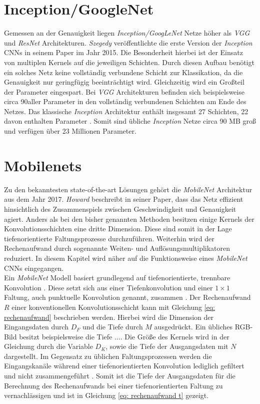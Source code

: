 		\section*{Inception/GoogleNet}
		\label{subsec: inception}
		Gemessen an der Genauigkeit liegen \textit{Inception/GoogLeNet} Netze höher als \textit{VGG} und \textit{ResNet} Architekturen. \textit{Szegedy} veröffentlichte die erste Version der \textit{Inception} CNNs in seinem Paper \cite{inception} im Jahr 2015. Die Besonderheit hierbei ist der Einsatz von multiplen Kernels auf die jeweiligen Schichten. Durch diesen Aufbau benötigt ein solches Netz keine vollständig verbundene Schicht zur Klassikation, da die Genauigkeit nur geringfügig beeinträchtigt wird. Gleichzeitig wird ein Großteil der Parameter eingespart. Bei \textit{VGG} Architekturen befinden sich beispielsweise circa 90\percent\text{ }aller Parameter in den vollständig verbundenen Schichten am Ende des Netzes. Das klassische \textit{Inception} Architektur enthält insgesamt 27 Schichten, 22 davon enthalten Parameter \cite{inception}. Somit sind übliche \textit{Inception} Netze circa 90 MB groß und verfügen über 23 Millionen Parameter.\\ 
		

		
		\section*{Mobilenets}
		\label{subsec: mobilenets}
		Zu den bekanntesten state-of-the-art Lösungen gehört die \textit{MobileNet} Architektur aus dem Jahr 2017. \textit{Howard} beschreibt in seiner Paper, dass das Netz effizient hinsichtlich des Zusammenspiels zwischen Geschwindigkeit und Genauigkeit agiert. Anders als bei den bisher genannten Methoden besitzen einige Kernels der Konvolutionsschichten eine dritte Dimension. Diese sind somit in der Lage tiefenorientierte Faltungsprozesse durchzuführen. Weiterhin wird der Rechenaufwand durch sogenannte Weiten- und Auflösungsmultiplikatoren reduziert. In diesem Kapitel wird näher auf die Funktionsweise eines \textit{MobileNet} CNNs eingegangen.\\
		
		Ein \textit{MobileNet} Modell basiert grundlegend auf tiefenorientierte, trennbare Konvolution \cite{mobilenets}. Diese setzt sich aus einer Tiefenkonvolution und einer $1\times1$ Faltung, auch punktuelle Konvolution genannt, zusammen \cite{mobilenets}. Der Rechenaufwand $R$ einer konventionellen Konvolutionsschicht kann mit Gleichung \ref{eq: rechenaufwand} beschrieben werden. Hierbei wird die Dimension der Eingangsdaten durch $D_F$ und die Tiefe durch $M$ ausgedrückt. Ein übliches RGB-Bild besitzt beispielsweise die Tiefe .... Die Größe des Kernels wird in der Gleichung durch die Variable $D_K$, sowie die Tiefe der Ausgangsdaten mit $N$ dargestellt. Im Gegensatz zu üblichen Faltungsprozessen werden die Eingangskanäle während einer tiefenorientierten Konvolution lediglich gefiltert und nicht zusammengeführt \cite{mobilenets}. Somit ist die Tiefe der Ausgangsdaten für die Berechnung des Rechenaufwands bei einer tiefenorientierten Faltung zu vernachlässigen und ist in Gleichung \ref{eq: rechenaufwand t} gezeigt. \\
		
